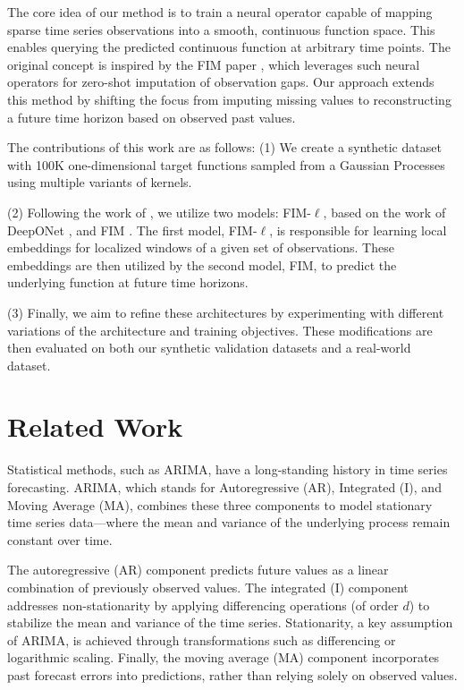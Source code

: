 \documentclass{article}
\theoremstyle{plain}
\theoremstyle{definition}
\theoremstyle{remark}
\begin{document}
The core idea of our method is to train a neural operator capable of mapping sparse time series observations into a smooth, continuous function space. This enables querying the predicted continuous function at arbitrary time points. The original concept is inspired by the FIM paper \cite{fim-l}, which leverages such neural operators for zero-shot imputation of observation gaps. Our approach extends this method by shifting the focus from imputing missing values to reconstructing a future time horizon based on observed past values.

The contributions of this work are as follows: (1) We create a synthetic dataset with 100K one-dimensional target functions sampled from a Gaussian Processes using multiple variants of kernels.

(2) Following the work of \cite{fim-l}, we utilize two models: FIM-$\ell$, based on the work of DeepONet \cite{Deeponet}, and FIM \cite{fim-l}. The first model, FIM-$\ell$, is responsible for learning local embeddings for localized windows of a given set of observations. These embeddings are then utilized by the second model, FIM, to predict the underlying function at future time horizons.

 (3) Finally, we aim to refine these architectures by experimenting with different variations of the architecture and training objectives. These modifications are then evaluated on both our synthetic validation datasets and a real-world dataset.

\section{Related Work}
Statistical methods, such as ARIMA, have a long-standing history in time series forecasting. ARIMA, which stands for Autoregressive (AR), Integrated (I), and Moving Average (MA), combines these three components to model stationary time series data—where the mean and variance of the underlying process remain constant over time.

The autoregressive (AR) component predicts future values as a linear combination of previously observed values. The integrated (I) component addresses non-stationarity by applying differencing operations (of order $d$) to stabilize the mean and variance of the time series. Stationarity, a key assumption of ARIMA, is achieved through transformations such as differencing or logarithmic scaling. Finally, the moving average (MA) component incorporates past forecast errors into predictions, rather than relying solely on observed values.
\end{document}
